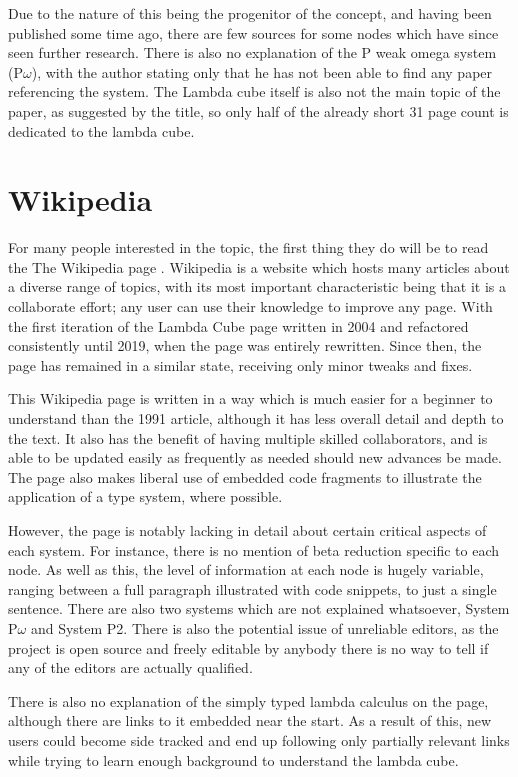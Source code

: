 \documentclass{l4proj}
\begin{document}
Due to the nature of this being the progenitor of the concept, and having been published some time ago, there are few sources for some nodes which have since seen further research.  There is also no explanation of the P weak omega system (P\underline{$\omega$}), with the author stating only that he has not been able to find any paper referencing the system.  The Lambda cube itself is also not the main topic of the paper, as suggested by the title, so only half of the already short 31 page count is dedicated to the lambda cube.

\section{Wikipedia}

For many people interested in the topic, the first thing they do will be to read the The Wikipedia page \citep{wikipedia}.  Wikipedia is a website which hosts many articles about a diverse range of topics, with its most important characteristic being that it is a collaborate effort; any user can use their knowledge to improve any page.  With the first iteration of the Lambda Cube page written in 2004 and refactored consistently until 2019, when the page was entirely rewritten.  Since then, the page has remained in a similar state, receiving only minor tweaks and fixes.

This Wikipedia page is written in a way which is much easier for a beginner to understand than the 1991 article, although it has less overall detail and depth to the text.  It also has the benefit of having multiple skilled collaborators, and is able to be updated easily as frequently as needed should new advances be made.  The page also makes liberal use of embedded code fragments to illustrate the application of a type system, where possible.

However, the page is notably lacking in detail about certain critical aspects of each system.  For instance, there is no mention of beta reduction specific to each node.  As well as this, the level of information at each node is hugely variable, ranging between a full paragraph illustrated with code snippets, to just a single sentence.  There are also two systems which are not explained whatsoever, System P\underline{$\omega$} and System P2.  There is also the potential issue of unreliable editors, as the project is open source and freely editable by anybody there is no way to tell if any of the editors are actually qualified.

There is also no explanation of the simply typed lambda calculus on the page, although there are links to it embedded near the start.  As a result of this, new users could become side tracked and end up following only partially relevant links while trying to learn enough background to understand the lambda cube.
\end{document}
